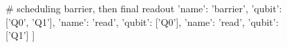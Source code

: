 \documentclass[journal]{IEEEtran}
\begin{document}
\begin{figure}
\begin{python}
    # scheduling barrier, then final readout
    {'name': 'barrier', 'qubit':['Q0', 'Q1']},
    {'name': 'read', 'qubit': ['Q0']},
    {'name': 'read', 'qubit': ['Q1']}
]
    \end{python}

\end{figure}
\end{document}

